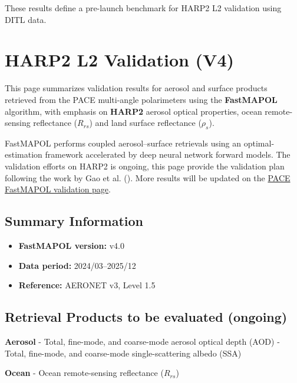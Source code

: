 \documentclass[
  11pt,
  letterpaper,
]{scrreprt}
\providecommand{\tightlist}{%
  \setlength{\itemsep}{0pt}\setlength{\parskip}{0pt}}
\begin{document}
These results define a pre-launch benchmark for HARP2 L2 validation
using DITL data.


\chapter{HARP2 L2 Validation (V4)}\label{harp2-l2-validation-v4}

This page summarizes validation results for aerosol and surface products
retrieved from the PACE multi-angle polarimeters using the
\textbf{FastMAPOL} algorithm, with emphasis on \textbf{HARP2} aerosol
optical properties, ocean remote-sensing reflectance (\(R_{rs}\)) and
land surface reflectance (\(\rho_s\)).

FastMAPOL performs coupled aerosol--surface retrievals using an
optimal-estimation framework accelerated by deep neural network forward
models. The validation efforts on HARP2 is ongoing, this page provide
the validation plan following the work by Gao et al.
(). More results will be updated on the
\href{https://pace.oceansciences.org/pace_fastmapol.htm}{PACE FastMAPOL
validation page}.

\section{Summary Information}\label{summary-information-2}

\begin{itemize}
\tightlist
\item
  \textbf{FastMAPOL version:} v4.0\\
\item
  \textbf{Data period:} 2024/03--2025/12\\
\item
  \textbf{Reference:} AERONET v3, Level 1.5
\end{itemize}

\section{Retrieval Products to be evaluated
(ongoing)}\label{retrieval-products-to-be-evaluated-ongoing}

\textbf{Aerosol} - Total, fine-mode, and coarse-mode aerosol optical
depth (AOD) - Total, fine-mode, and coarse-mode single-scattering albedo
(SSA)

\textbf{Ocean} - Ocean remote-sensing reflectance (\(R_{rs}\))
\end{document}
